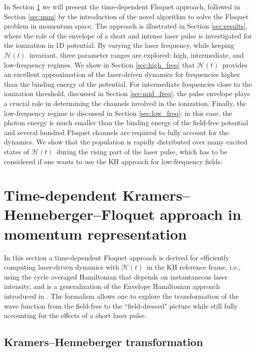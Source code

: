 \documentclass[
pra%
,preprint%
,amssymb, nobibnotes, aps, superscriptaddress, floatfix]{revtex4}
\newcommand{\CAHt}{$\mathcal{H}(t)$}
\begin{document}
In Section \ref{sec:theory} we will present the time-dependent Floquet approach, followed in Section \ref{sec:num} by the introduction of the novel algorithm to solve the Floquet problem in momentum space. The approach is illustrated in Section \ref{sec:results}, where the role of the envelope of a short and intense laser pulse is investigated for the ionization in 1D potential. By varying the laser frequency, while keeping \CAHt\ invariant, three parameter ranges are explored: high, intermediate, and low-frequency regimes. We show in Section \ref{sec:high_freq} that \CAHt\ provides an excellent approximation of the laser-driven dynamics for frequencies higher than the binding energy of the potential. 
For intermediate frequencies close to the ionization threshold, discussed in Section \ref{sec:mid_freq}, the pulse envelope plays a crucial role in determining the channels involved in the ionization.
Finally, the low-frequency regime is discussed in Section \ref{sec:low_freq}; in this case, the photon energy is much smaller than the binding energy of the field-free potential and several hundred Floquet channels are required to fully account for the dynamics. 
We show that the population is rapidly distributed over many excited states of \CAHt\ during the rising part of the laser pulse, which has to be considered if one wants to use the KH approach for low-frequency fields.


%
%
%


\pagebreak
\section{Time-dependent Kramers--Henneberger--Floquet approach in momentum representation} \label{sec:theory}

In this section a time-dependent Floquet approach is derived for efficiently computing laser-driven dynamics with \CAHt\ in the KH reference frame, i.e., using the cycle averaged Hamiltonian that depends on instantaneous laser intensity, and is a generalization of the Envelope Hamiltonian approach introduced in \cite{Toyota}. The formalism allows one to explore the transformation of the wave function from the field-free to the ``field-dressed" picture while still fully accounting for the effects of a short laser pulse.

\subsection{Kramers--Henneberger transformation}
\end{document}
